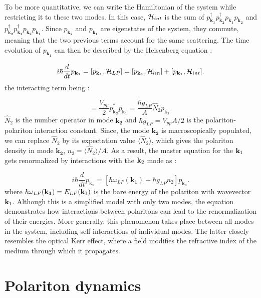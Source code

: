 To be more quantitative, we can write the Hamiltonian of the system while restricting it to these two modes. In this case, $\mathcal{H}_{int}$ is the sum of $p^\dagger_\mathbf{k_1}p^\dagger_\mathbf{k_2}p_\mathbf{k_1}p_\mathbf{k_2}$ and $p^\dagger_\mathbf{k_2}p^\dagger_\mathbf{k_1}p_\mathbf{k_2}p_\mathbf{k_1}$. Since $p_\mathbf{k_2}$ and $p_\mathbf{k_1}$ are eigenstates of the system, they commute, meaning that the two previous terms account for the same scattering.
The time evolution of $p_{\mathbf{k_1}}$ can then be described by the Heisenberg equation : 

\begin{equation}
    i\hbar \dfrac{d}{dt}p_\mathbf{k_1} = [p_\mathbf{k_1}, \mathcal{H}_{LP}] = [p_\mathbf{k_1},\mathcal{H}_{lin}] + [p_\mathbf{k_1},\mathcal{H}_{int}].
\end{equation}
the interacting term being :

\begin{equation}
    [p_\mathbf{k_1},\Ham_{int}]=\dfrac{V_{pp}}{2}p^\dagger_\mathbf{k_2}p_\mathbf{k_1}= \dfrac{\hbar g_{LP}}{A}\hat{N}_{2}p_\mathbf{k_1}.
\end{equation}
$\hat{N}_{2}$ is the number operator in mode $\mathbf{k_2}$ and $\hbar g_{LP} = V_{pp}A/2$  is the polariton-polariton interaction constant. Since, the mode 
$\mathbf{k_2}$ is macroscopically populated, we can replace $\hat{N}_{2}$ by its expectation value $\langle \hat{N}_{2} \rangle$, which gives the polariton density in mode $\mathbf{k_2}$, $n_{2}=\langle \hat{N}_{2} \rangle/A$.
As a result, the master equation for the $\mathbf{k}_1$ gets renormalized by interactions with the $\mathbf{k}_2$ mode as :

\begin{equation}
    i\hbar \dfrac{d}{dt}p_\mathbf{k_1} = \left[\hbar\omega_{LP}(\mathbf{k_1}) + \hbar g_{LP}n_{2}\right]p_\mathbf{k_1}.
    \label{eq:renormalized_energy}
\end{equation}
where $\hbar\omega_{LP}(\mathbf{k_1})=E_{LP}(\mathbf{k}_1)$ is the bare energy of the polariton with wavevector $\mathbf{k}_1$. Although this is a simplified model with only two modes, the equation demonstrates how interactions between polaritons can lead to the renormalization of their energies. More generally, this phenomenon takes place between all modes in the system, including self-interactions of individual modes.
 The latter closely resembles the optical Kerr effect, where a field modifies the refractive index of the medium through which it propagates.

\section{Polariton dynamics}

